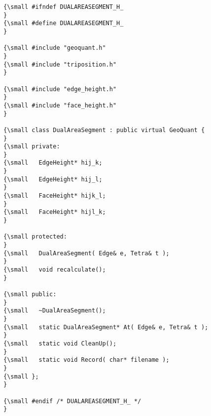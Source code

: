 {\small }
\begin{verbatim}
{\small #ifndef DUALAREASEGMENT_H_
}
{\small #define DUALAREASEGMENT_H_
}
 
{\small #include "geoquant.h"
}
{\small #include "triposition.h"
}
 
{\small #include "edge_height.h"
}
{\small #include "face_height.h"
}
 
{\small class DualAreaSegment : public virtual GeoQuant {
}
{\small private:
}
{\small   EdgeHeight* hij_k;
}
{\small   EdgeHeight* hij_l;
}
{\small   FaceHeight* hijk_l;
}
{\small   FaceHeight* hijl_k;
}
 
{\small protected:
}
{\small   DualAreaSegment( Edge& e, Tetra& t );
}
{\small   void recalculate();
}
 
{\small public:
}
{\small   ~DualAreaSegment();
}
{\small   static DualAreaSegment* At( Edge& e, Tetra& t );
}
{\small   static void CleanUp();
}
{\small   static void Record( char* filename );
}
{\small };
}
 
{\small #endif /* DUALAREASEGMENT_H_ */
}
\end{verbatim}

